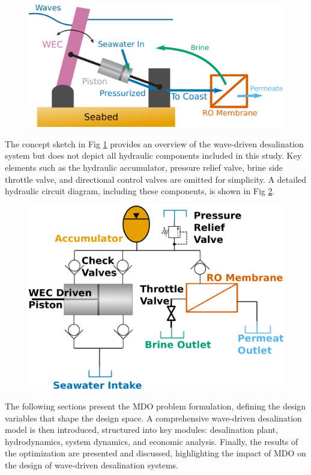 \documentclass[twocolumn,10pt]{asme2e}
\begin{document}
\begin{figure}[b!]
    \includegraphics[width=\linewidth]{../figs/wdds.pdf}
    \label{fig:WDDS}
\end{figure}

The concept sketch in Fig \ref{fig:WDDS} provides an overview of the wave-driven desalination system but does not depict all hydraulic components included in this study. Key elements such as the hydraulic accumulator, pressure relief valve, brine side throttle valve, and directional control valves are omitted for simplicity. A detailed hydraulic circuit diagram, including these components, is shown in Fig \ref{fig:hydraulics}.

\begin{figure}[t!]
    \centering
    \includegraphics[width=0.7\linewidth]{../figs/hydraulic_circuit.pdf}
    \label{fig:hydraulics}
\end{figure}

The following sections present the MDO problem formulation, defining the design variables that shape the design space. A comprehensive wave-driven desalination model is then introduced, structured into key modules: desalination plant, hydrodynamics, system dynamics, and economic analysis. Finally, the results of the optimization are presented and discussed, highlighting the impact of MDO on the design of wave-driven desalination systems.
\end{document}
